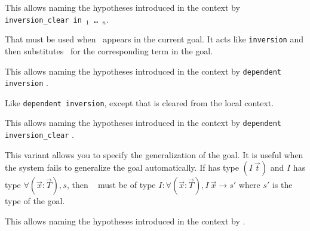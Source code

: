 \begin{Variants}
\item {}
  {}

  This allows naming the hypotheses introduced in the context by
  \texttt{inversion\_clear {\ident} in \ident$_1$ \dots\ \ident$_n$}.

\item {} {}

  That must be used when \ident\ appears in the current goal.  It acts
  like \texttt{inversion} and then substitutes \ident\ for the
  corresponding term in the goal.

\item {} {}

  This allows naming the hypotheses introduced in the context by
  \texttt{dependent inversion} {\ident}.

\item {} {}

  Like \texttt{dependent inversion}, except that {\ident} is cleared
  from the local context.

\item {}
  {}

  This allows naming the hypotheses introduced in the context by
  \texttt{dependent inversion\_clear} {\ident}.

\item {} {}

  This variant allows you to specify the generalization of the goal. It
  is useful when the system fails to generalize the goal automatically. If
  {\ident} has type $(I~\vec{t})$ and $I$ has type
  $\forall (\vec{x}:\vec{T}), s$,   then \term~  must be of type
  $I:\forall (\vec{x}:\vec{T}), I~\vec{x}\to s'$ where $s'$ is the
  type of the goal.

\item {}
  {}

  This allows naming the hypotheses introduced in the context by
  {}.


\end{Variants}

